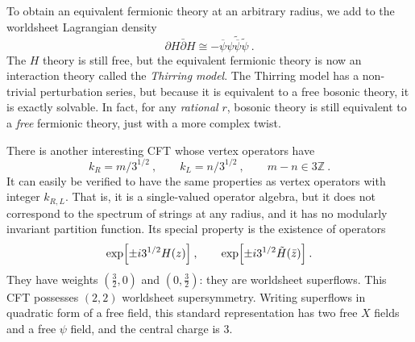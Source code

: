 	
	To obtain an equivalent fermionic theory at an arbitrary radius, we add to the worldsheet Lagrangian density
	\begin{equation}
		\partial H \bar{\partial} H \cong -\overline{\psi}\psi\tilde{\overline{\psi}} \tilde{\psi}\:. \label{10.7.19}
	\end{equation}
	The $H$ theory is still free, but the equivalent fermionic theory is now an interaction theory called the \emph{Thirring model}. The Thirring model has a non-trivial perturbation series, but because it is equivalent to a free bosonic theory, it is exactly solvable. In fact, for any \emph{rational} $r$, bosonic theory is still equivalent to a \emph{free} fermionic theory, just with a more complex twist.
	
	There is another interesting CFT whose vertex operators have
	\begin{equation}
		k_{R} = m/3^{1/2}\:,\qquad k_{L}=n/3^{1/2} \:,\qquad m-n\in 3\mathds{Z} \:. \label{10.7.20}
	\end{equation}
	It can easily be verified to have the same properties as vertex operators with integer $k_{R,L}$. That is, it is a single-valued operator algebra, but it does not correspond to the spectrum of strings at any radius, and it has no modularly invariant partition function. Its special property is the existence of operators
	\begin{equation}
		\exp\Bigl[\pm i 3^{1/2}H(z)\Bigr]\:, \qquad \exp\Bigl[\pm i 3^{1/2}\tilde{H}(\bar{z})\Bigr]\:.\label{10.7.21}
	\end{equation}
	They have weights $(\frac{3}{2},0)$ and $(0,\frac{3}{2})$: they are worldsheet superflows. This CFT possesses $(2,2)$ worldsheet supersymmetry. Writing superflows in quadratic form of a free field, this standard representation has two free $X$ fields and a free $\psi$ field, and the central charge is 3.
	
